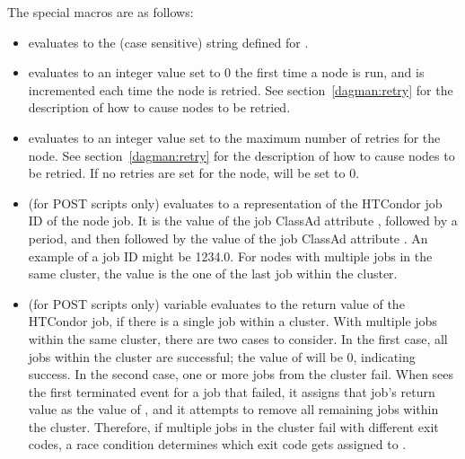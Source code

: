 \begin{itemize}
The special macros are as follows:

\begin{itemize}
\item {}
 evaluates to the (case sensitive) string
defined for .

\item {}
 evaluates to an 
integer value set to 0 the first time a node is run,
and is incremented each time the node is retried. 
See section~\ref{dagman:retry} for the description of how to cause
nodes to be retried. 

\item {}
 evaluates to an integer value set 
to the maximum number of retries for the node.
See section~\ref{dagman:retry} for the description of how to cause
nodes to be retried.  
If no retries are set for the node,
 will be set to 0.

\item {}
 (for POST scripts only)
evaluates to a representation of the HTCondor job ID of the node job.
It is the value of the job ClassAd attribute ,
followed by a period,
and then followed by the value of the job ClassAd attribute .
An example of a job ID might be 1234.0.
For nodes with multiple jobs in the same cluster,
the  value is the one of the last job within the cluster.

\item {}
 (for POST scripts only) variable evaluates to
the return value of the 
HTCondor job, if there is a single job within a cluster.
With multiple jobs within the same cluster,
there are two cases to consider.
In the first case, all jobs within the cluster are successful;
the value of  will be 0, indicating success.
In the second case,
one or more jobs from the cluster fail.
When  sees the first terminated event for a job that failed,
it assigns that job's return value as the value of ,
and it attempts to remove all remaining jobs within the cluster.
Therefore, if multiple jobs in the cluster fail with different exit codes,
a race condition determines which exit code gets assigned to .


\end{itemize}
\end{itemize}
